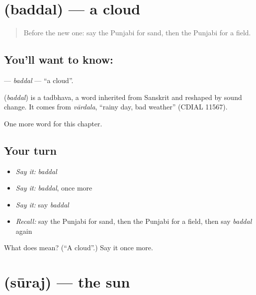 \section[\texorpdfstring{\pa{ਬੱਦਲ} (baddal)}{ਬੱਦਲ (baddal)}]{ (baddal) — a cloud}

\label{lesson:PA-C75-baddal}



\begin{quote}
Before the new one: say the Punjabi for sand, then the Punjabi for a field.
\end{quote}

\subsection*{You'll want to know: }
\textbf{} — \emph{baddal} — \textquotedblleft{}a cloud\textquotedblright{}.

\begin{cousinweb}
\textbf{} (\emph{baddal}) is a tadbhava, a word inherited from Sanskrit and reshaped by sound change. It comes from \emph{vārdala}, \textquotedblleft{}rainy day, bad weather\textquotedblright{} (CDIAL 11567).
\end{cousinweb}

\begin{grammarlens}[title={What you've built}]
One more word for this chapter.
\end{grammarlens}

\subsection*{Your turn}
\begin{itemize}
\raggedright
  \item \emph{Say it:} \emph{baddal}
  \item \emph{Say it:} \emph{baddal}, once more
  \item \emph{Say it:} say \emph{baddal}
  \item \emph{Recall:} say the Punjabi for sand, then the Punjabi for a field, then say \emph{baddal} again
\end{itemize}

\begin{tcolorbox}[breakable,colback=teal!4,colframe=teal!35!black,title={Before you move on}]
What does  mean? (\textquotedblleft{}A cloud\textquotedblright{}.) Say it once more.
\end{tcolorbox}
\section[\texorpdfstring{\pa{ਸੂਰਜ} (sūraj)}{ਸੂਰਜ (sūraj)}]{ (sūraj) — the sun}

